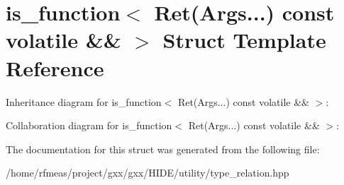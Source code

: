 \hypertarget{structis__function_3_01Ret_07Args_8_8_8_08_01const_01volatile_01_6_6_01_4}{}\section{is\+\_\+function$<$ Ret(Args...) const volatile \&\& $>$ Struct Template Reference}
\label{structis__function_3_01Ret_07Args_8_8_8_08_01const_01volatile_01_6_6_01_4}


Inheritance diagram for is\+\_\+function$<$ Ret(Args...) const volatile \&\& $>$\+:


Collaboration diagram for is\+\_\+function$<$ Ret(Args...) const volatile \&\& $>$\+:


The documentation for this struct was generated from the following file\+:\begin{DoxyCompactItemize}
\item 
/home/rfmeas/project/gxx/gxx/\+H\+I\+D\+E/utility/type\+\_\+relation.\+hpp\end{DoxyCompactItemize}
